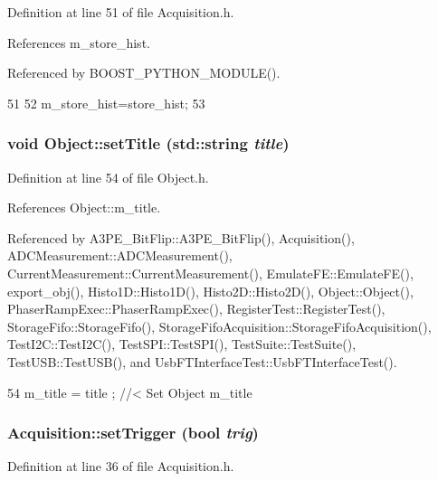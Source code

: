 Definition at line 51 of file Acquisition.h.

References m\_\-store\_\-hist.

Referenced by BOOST\_\-PYTHON\_\-MODULE().


\begin{DoxyCode}
51                                      {
52     m_store_hist=store_hist;
53   }
\end{DoxyCode}
\hypertarget{classObject_a89557dbbad5bcaa02652f5d7fa35d20f}{
\subsubsection[{setTitle}]{\setlength{\rightskip}{0pt plus 5cm}void Object::setTitle (std::string {\em title})}}
\label{classObject_a89557dbbad5bcaa02652f5d7fa35d20f}


Definition at line 54 of file Object.h.

References Object::m\_\-title.

Referenced by A3PE\_\-BitFlip::A3PE\_\-BitFlip(), Acquisition(), ADCMeasurement::ADCMeasurement(), CurrentMeasurement::CurrentMeasurement(), EmulateFE::EmulateFE(), export\_\-obj(), Histo1D::Histo1D(), Histo2D::Histo2D(), Object::Object(), PhaserRampExec::PhaserRampExec(), RegisterTest::RegisterTest(), StorageFifo::StorageFifo(), StorageFifoAcquisition::StorageFifoAcquisition(), TestI2C::TestI2C(), TestSPI::TestSPI(), TestSuite::TestSuite(), TestUSB::TestUSB(), and UsbFTInterfaceTest::UsbFTInterfaceTest().


\begin{DoxyCode}
54 { m_title = title ; } //< Set Object m_title
\end{DoxyCode}
\hypertarget{classAcquisition_acdb167b43f3babb59a98698aa5c5066f}{
\subsubsection[{setTrigger}]{ Acquisition::setTrigger (bool {\em trig})}}
\label{classAcquisition_acdb167b43f3babb59a98698aa5c5066f}


Definition at line 36 of file Acquisition.h.

